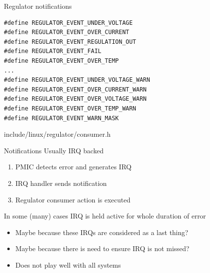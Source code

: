 \documentclass[10pt]{beamer}
\begin{document}

\begin{frame}[fragile]{Regulator notifications}
\begin{lstlisting}
#define REGULATOR_EVENT_UNDER_VOLTAGE
#define REGULATOR_EVENT_OVER_CURRENT
#define REGULATOR_EVENT_REGULATION_OUT
#define REGULATOR_EVENT_FAIL
#define REGULATOR_EVENT_OVER_TEMP
...
#define REGULATOR_EVENT_UNDER_VOLTAGE_WARN
#define REGULATOR_EVENT_OVER_CURRENT_WARN
#define REGULATOR_EVENT_OVER_VOLTAGE_WARN
#define REGULATOR_EVENT_OVER_TEMP_WARN
#define REGULATOR_EVENT_WARN_MASK
\end{lstlisting}
include/linux/regulator/consumer.h
\end{frame}


\begin{frame}{Notifications}
Usually IRQ backed
\begin{enumerate}
	\item PMIC detects error and generates IRQ
	\item IRQ handler sends notification
	\item Regulator consumer action is executed
\end{enumerate}
\pause
In some (many) cases IRQ is held active for whole duration of error
\begin{itemize}
	\item Maybe because these IRQs are considered as a last thing?
	\item Maybe because there is need to ensure IRQ is not missed?
	\item Does not play well with all systems
\end{itemize}
\end{frame}

\end{document}
